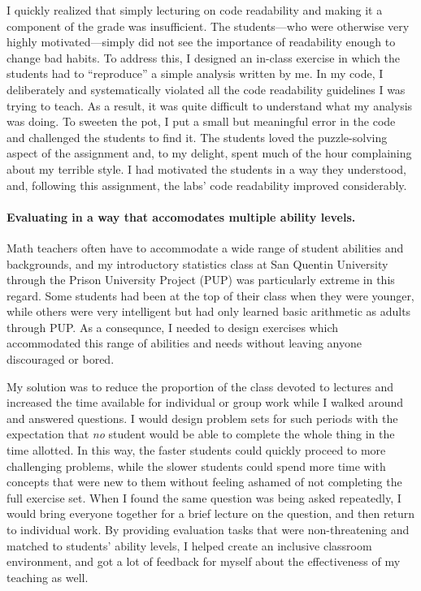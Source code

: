 I quickly realized that simply lecturing on code readability and making it a
component of the grade was insufficient.   The students---who were otherwise
very highly motivated---simply did not see the importance of readability
enough to change bad habits.  To address this, I designed an in-class exercise
in which the students had to ``reproduce'' a simple analysis written by me.  In
my code, I deliberately and systematically violated all the code readability
guidelines I was trying to teach.  As a result, it was quite difficult to
understand what my analysis was doing.  To sweeten the pot, I put a small but
meaningful error in the code and challenged the students to find it.  The
students loved the puzzle-solving aspect of the assignment and, to my delight,
spent much of the hour complaining about my terrible style.  I had motivated the
students in a way they understood, and, following this assignment, the labs'
code readability improved considerably.

\paragraph{Evaluating in a way that accomodates multiple ability levels.}

Math teachers often have to accommodate a wide range of student abilities and
backgrounds, and my introductory statistics class at San Quentin University
through the Prison University Project (PUP) was particularly extreme in this
regard.  Some students had been at the top of their class when they were
younger, while others were very intelligent but had only learned basic
arithmetic as adults through PUP.  As a consequnce, I needed to design exercises
which accommodated this range of abilities and needs without leaving anyone
discouraged or bored.

My solution was to reduce the proportion of the class devoted to lectures and
increased the time available for individual or group work while I walked around
and answered questions.  I would design problem sets for such periods with the
expectation that \emph{no} student would be able to complete the whole thing in
the time allotted. In this way, the faster students could quickly proceed to
more challenging problems, while the slower students could spend more time with
concepts that were new to them without feeling ashamed of not completing the
full exercise set. When I found the same question was being asked repeatedly, I
would bring everyone together for a brief lecture on the question, and then
return to individual work.  By providing evaluation tasks that were
non-threatening and matched to students' ability levels, I helped create an
inclusive classroom environment, and got a lot of feedback for myself about the
effectiveness of my teaching as well.

